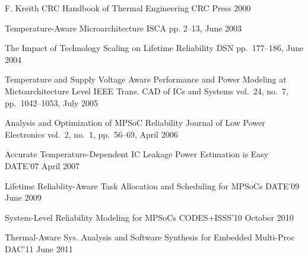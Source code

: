 \begin{thebibliography}{99}
  \small
    \publication
      {F. Kreith}
      {CRC Handbook of Thermal Engineering}
      {CRC Press}
      {2000}

    \publication
      {}
      {Temperature-Aware Microarchitecture}
      {ISCA}
      {pp. 2--13, June 2003}


    \publication
      {}
      {The Impact of Technology Scaling on Lifetime Reliability}
      {DSN}
      {pp.~177--186, June 2004}

    \publication
      {}
      {Temperature and Supply Voltage Aware Performance and Power Modeling at Mictoarchitecture Level}
      {IEEE Trans. CAD of ICs and Systems}
      {vol.~24, no.~7, pp.~1042--1053, July 2005}

    \publication
      {}
      {Analysis and Optimization of MPSoC Reliability}
      {Journal of Low Power Electronics}
      {vol.~2, no.~1, pp.~56--69, April 2006}

    \publication
      {}
      {Accurate Temperature-Dependent IC Leakage Power Estimation is Easy}
      {DATE'07}
      {April 2007}

    \publication
      {}
      {Lifetime Reliablity-Aware Task Allocation and Scheduling for MPSoCs}
      {DATE'09}
      {June 2009}

    \publication
      {}
      {System-Level Reliability Modeling for MPSoCs}
      {CODES+ISSS'10}
      {October 2010}

    \publication
      {}
      {Thermal-Aware Sys. Analysis and Software Synthesis for Embedded Multi-Proc}
      {DAC'11}
      {June 2011}


\end{thebibliography}
